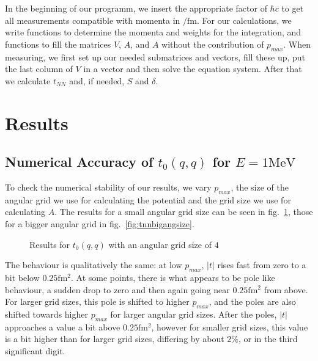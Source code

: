 \documentclass{scrartcl}
\begin{document}
In the beginning of our programm, we insert the appropriate factor of $\hbar c$ to get all measurements compatible with momenta in $\si{\per\femto\meter}$.
For our calculations, we write functions to determine the momenta and weights for the integration, and functions to fill the matrices $V$, $A$, and $A$ without the contribution of $p_{max}$. When measuring, we first set up our needed submatrices and vectors, fill these up, put the last column of $V$ in a vector and then solve the equation system. After that we calculate $t_{NN}$ and, if needed, $S$ and $\delta$.


\section{Results}
\subsection{Numerical Accuracy of $t_0(q,q)$ for $E=1\si{\mega\electronvolt}$}

To check the numerical stability of our results, we vary $p_{max}$, the size of the angular grid we use for calculating the potential and the grid size we use for calculating $A$. The results for a small angular grid size can be seen in fig.~\ref{fig:tnnsmallangsize}, those for a bigger angular grid in fig.~\ref{fig:tnnbigangsize}.


\begin{figure}[htbp]
	
	\caption{Results for $t_0(q,q)$ with an angular grid size of $4$}
	\label{fig:tnnsmallangsize}
\end{figure}


The behaviour is qualitatively the same: at low $p_{max}$, $|t|$ rises fast from zero to a bit below $0.25\si{\femto\meter^2}$. At some points, there is what appears to be pole like behaviour, a sudden drop to zero and then again going near $0.25\si{\femto\meter^2}$ from above. For larger grid sizes, this pole is shifted to higher $p_{max}$, and the poles are also shifted towards higher $p_{max}$ for larger angular grid sizes. After the poles, $|t|$ approaches a value a bit above $0.25\si{\femto\meter^2}$, however for smaller grid sizes, this value is a  bit higher than for larger grid sizes, differing by about $2\%$, or in the third significant digit.
\end{document}
